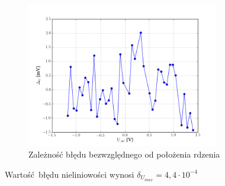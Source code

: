 \documentclass[a4paper, 12pt, titlepage]{article}
\begin{document}
			\begin{figure}[H]
				\centering
				\includegraphics[width=0.75\textwidth]{./img/Uac_Udc_blad.png}
				\caption{\small{Zależność błędu bezwzględnego od położenia rdzenia}}
			\end{figure} \noindent
			Wartość błędu nieliniowości wynosi $\delta_{U_{max}} = 4,4 \cdot 10^{-4}$
\end{document}

